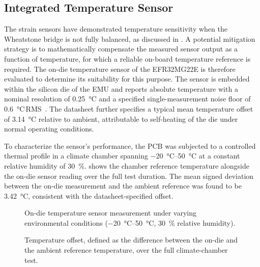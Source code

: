\subsection{Integrated Temperature Sensor} \label{sec:temp_sensor}

The strain sensors have demonstrated temperature sensitivity when the Wheatstone bridge is not fully balanced, as discussed in . A potential mitigation strategy is to mathematically compensate the measured sensor output as a function of temperature, for which a reliable on-board temperature reference
is required. The on-die temperature sensor of the EFR32MG22E is therefore evaluated to determine its
suitability for this purpose. The sensor is embedded within the silicon die of the EMU and reports absolute temperature with a nominal resolution of \SI{0.25}{\celsius} and a
specified single-measurement noise floor of \SI{0.6}{\celsius}\,RMS~\cite{EFR32MG22E}.
The datasheet further specifies a typical mean temperature offset of \SI{3.14}{\celsius}
relative to ambient, attributable to self-heating of the die under normal operating
conditions.

To characterize the sensor's performance, the PCB was subjected to a controlled thermal
profile in a climate chamber spanning \SIrange{-20}{50}{\celsius} at a constant relative
humidity of \SI{30}{\percent}.
 shows the chamber reference temperature alongside the on-die sensor
reading over the full test duration.
The mean signed deviation between the on-die measurement and the ambient reference was
found to be \SI{+3.42}{\celsius}, consistent with the datasheet-specified offset.

\begin{figure}
    \centering
    
    \caption{On-die temperature sensor measurement under varying environmental conditions
             (\SIrange{-20}{50}{\celsius}, \SI{30}{\percent} relative humidity).}
    \label{fig:FS_temp}
\end{figure}

\begin{figure}
    \centering
    
    \caption{Temperature offset, defined as the difference between the on-die and the ambient reference temperature, over the full climate-chamber test.}
    \label{fig:temp_diff}
\end{figure}

